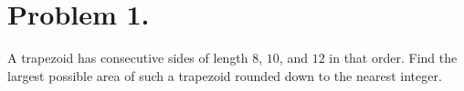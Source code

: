 \section{Problem 1.}

A trapezoid has consecutive sides of length $8$, $10$, and $12$ in that order. 
Find the largest possible area of such a trapezoid rounded down to the nearest integer.

\begin{solution}

\end{solution}
